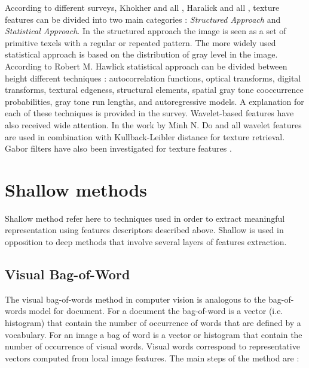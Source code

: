    According to different surveys, Khokher and all \cite{khokher2012content}, Haralick and all \cite{haralick1979statistical}, texture features can be divided into two main categories : \textit{Structured Approach} and \textit{Statistical Approach}.
   In the structured approach the image is seen as a set of primitive texels with a regular or repeated pattern.
   The more widely used statistical approach is based on the distribution of gray level in the image. According to Robert M. Hawlick \cite{haralick1979statistical} statistical approach can be divided between height different techniques : autocorrelation functions, optical transforms, digital transforms, textural edgeness, structural elements, spatial gray tone cooccurrence probabilities, gray tone run lengths, and autoregressive models. A explanation for each of these techniques is provided in the survey. Wavelet-based features have also received wide attention. In the work by Minh N. Do and all \cite{do2002wavelet} wavelet features are used in combination with Kullback-Leibler distance for texture retrieval. Gabor filters have also been investigated for texture features \cite{grigorescu2002comparison}.


  \section{Shallow methods}

    Shallow method refer here to techniques used in order to extract meaningful representation using features descriptors described above. Shallow is used in opposition to deep methods that involve several layers of features extraction.

    \subsection{Visual Bag-of-Word}

    The visual bag-of-words method in computer vision is analogous to the bag-of-words model for document. For a document the bag-of-word is a vector (i.e. histogram) that contain the number of occurrence of words that are defined by a vocabulary. For an image a bag of word is a vector or histogram that contain the number of occurrence of visual words. Visual words correspond to representative vectors computed from local image features. The main steps of the method are :

